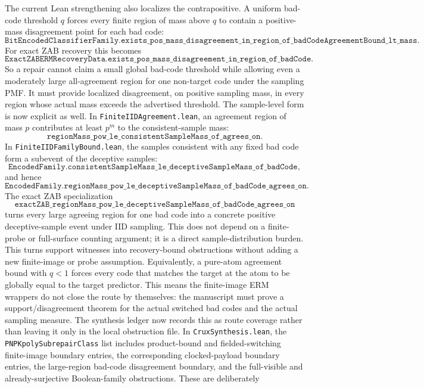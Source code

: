 \documentclass[11pt]{article}
\theoremstyle{remark}
\begin{document}
The current Lean strengthening also localizes the contrapositive.  A uniform
bad-code threshold \(q\) forces every finite region of mass above \(q\) to
contain a positive-mass disagreement point for each bad code:
\[
  \texttt{BitEncodedClassifierFamily.exists\_pos\_mass\_disagreement\_in\_region\_of\_badCodeAgreementBound\_lt\_mass}.
\]
For exact ZAB recovery this becomes
\[
  \texttt{ExactZABERMRecoveryData.exists\_pos\_mass\_disagreement\_in\_region\_of\_badCode}.
\]
So a repair cannot claim a small global bad-code threshold while allowing even a
moderately large all-agreement region for one non-target code under the sampling
PMF.  It must provide localized disagreement, on positive sampling mass, in
every region whose actual mass exceeds the advertised threshold.
The sample-level form is now explicit as well.  In \texttt{FiniteIIDAgreement.lean},
an agreement region of mass \(p\) contributes at least \(p^m\) to the
consistent-sample mass:
\[
  \texttt{regionMass\_pow\_le\_consistentSampleMass\_of\_agrees\_on}.
\]
In \texttt{FiniteIIDFamilyBound.lean}, the samples consistent with any fixed bad
code form a subevent of the deceptive samples:
\[
  \texttt{EncodedFamily.consistentSampleMass\_le\_deceptiveSampleMass\_of\_badCode},
\]
and hence
\[
  \texttt{EncodedFamily.regionMass\_pow\_le\_deceptiveSampleMass\_of\_badCode\_agrees\_on}.
\]
The exact ZAB specialization
\[
  \texttt{exactZAB\_regionMass\_pow\_le\_deceptiveSampleMass\_of\_badCode\_agrees\_on}
\]
turns every large agreeing region for one bad code into a concrete positive
deceptive-sample event under IID sampling.  This does not depend on a finite-probe
or full-surface counting argument; it is a direct sample-distribution burden.
This turns support witnesses into recovery-bound obstructions without adding a
new finite-image or probe assumption.
Equivalently, a pure-atom agreement bound with \(q<1\) forces every code that
matches the target at the atom to be globally equal to the target predictor.
This means the finite-image ERM wrappers do not close the route by themselves:
the manuscript must prove a support/disagreement theorem for the actual
switched bad codes and the actual sampling measure.
The synthesis ledger now records this as route coverage rather than leaving it
only in the local obstruction file.  In \texttt{CruxSynthesis.lean}, the
\texttt{PNPKpolySubrepairClass} list includes product-bound and fielded-switching
finite-image boundary entries, the corresponding clocked-payload boundary
entries, the large-region bad-code disagreement boundary, and the full-visible
and already-surjective Boolean-family obstructions.  These are deliberately
\end{document}
